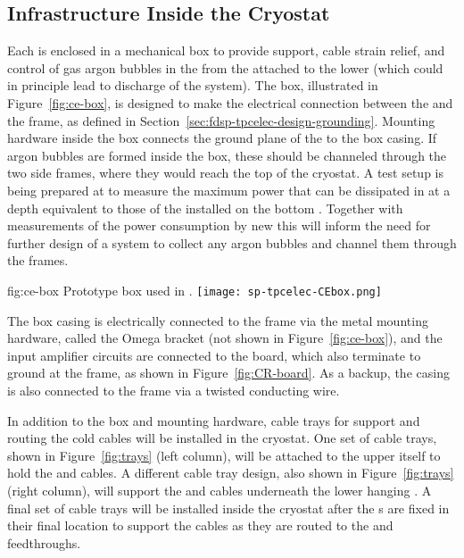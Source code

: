 \subsection{Infrastructure Inside the Cryostat}
\label{sec:fdsp-tpcelec-design-infrastructure}

Each  is enclosed in a mechanical  box 
to provide support, cable strain relief, and control of gas 
argon bubbles in the  from the  attached 
to the lower  (which could in principle lead to 
discharge of the  system). The  box, 
illustrated in Figure~\ref{fig:ce-box}, is designed to make the 
electrical connection between the  and the  
frame, as defined in Section~\ref{sec:fdsp-tpcelec-design-grounding}.
Mounting hardware inside the  box connects the ground plane 
of the  to the box casing. If argon bubbles are formed inside
the  box, these should be channeled through the two side
 frames, where they would reach the top of the cryostat.
A test setup is being prepared at  to measure the
maximum power that can be dissipated in  at a
depth equivalent to those of the  installed on
the bottom . Together with measurements of the
power consumption by new  this will inform
the need for further design of a system to collect any
argon bubbles and channel them through the  frames.

\begin{dunefigure}
{fig:ce-box}
{Prototype  box used in .}
\texttt{[image: sp-tpcelec-CEbox.png]}
\end{dunefigure}

The  box casing is electrically connected to the 
 frame via the metal mounting hardware, called the 
Omega bracket (not shown in Figure~\ref{fig:ce-box}), and the 
input amplifier circuits are connected to the  board, 
which also terminate to ground at the  frame, as 
shown in Figure~\ref{fig:CR-board}. As a backup, the casing is 
also connected to the  frame via a twisted conducting wire.

In addition to the  box and mounting hardware, cable trays 
for support and routing the cold cables will be installed in the 
cryostat. One set of cable trays, shown in Figure~\ref{fig:trays} 
(left column), will be attached to the upper  itself 
to hold the  and  cables. A different cable 
tray design, also shown in Figure~\ref{fig:trays} (right column), 
will support the  and  cables underneath the 
lower hanging . A final set of cable trays will be 
installed inside the cryostat after the s are 
fixed in their final location to support the cables as they are 
routed to the  and  feedthroughs.

